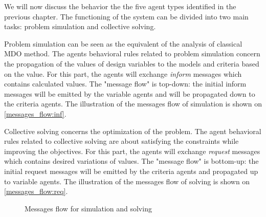 We will now discuss the behavior the the five agent types identified in the previous chapter. The functioning of the system can be divided into two main tasks: problem simulation and collective solving.

Problem simulation can be seen as the equivalent of the analysis of classical MDO method. The agents behavioral rules related to problem simulation concern the propagation of the values of design variables to the models and criteria based on the value. For this part, the agents will exchange \emph{inform} messages which contains calculated values. The "message flow" is top-down: the initial inform messages will be emitted by the variable agents and will be propagated down to the criteria agents. The illustration of the messages flow of simulation is shown on \figurename{} \ref{messages_flow:inf}.

Collective solving concerns the optimization of the problem. The agent behavioral rules related to collective solving are about satisfying the constraints while improving the objectives. For this part, the agents will exchange \emph{request} messages which contains desired variations of values. The "message flow" is bottom-up: the initial request messages will be emitted by the criteria agents and propagated up to variable agents. The illustration of the messages flow of solving is shown on \figurename{} \ref{messages_flow:req}.

\begin{figure}[h]
	\hfill

	\centering
	
	\caption{Messages flow for simulation and solving}
	\label{messages_flow}

\end{figure}

